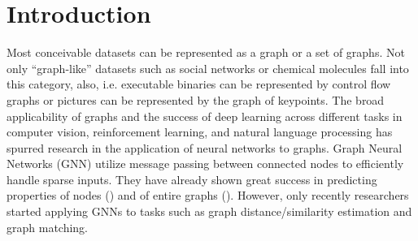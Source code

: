 \section{Introduction}

Most conceivable datasets can be represented as a graph or a set of graphs. Not only “graph-like” datasets such as social networks or chemical molecules fall into this category, also, i.e. executable binaries can be represented by control flow graphs or pictures can be represented by the graph of keypoints. %
The broad applicability of graphs and the success of deep learning across different tasks in computer vision, reinforcement learning, and natural language processing has spurred research in the application of neural networks to graphs. Graph Neural Networks (GNN) utilize message passing between connected nodes to efficiently handle sparse inputs. They have already shown great success in predicting properties of nodes (\cite{kipf2017}) and of entire graphs (\citealp{gilmer2017}). However, only recently researchers started applying GNNs to tasks such as graph distance/similarity estimation and graph matching.

